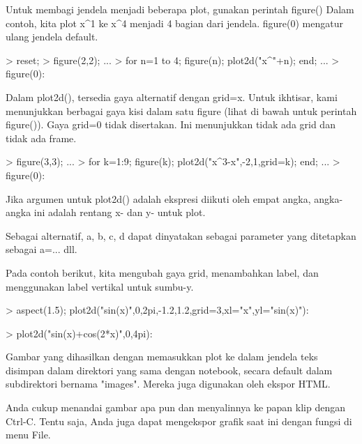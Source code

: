 \documentclass[a4paper,10pt]{article}
\begin{document}
\begin{eulernotebook}
\begin{eulercomment}
\begin{eulercomment}
\begin{eulercomment}
\begin{eulercomment}
\begin{eulercomment}
\begin{eulercomment}
\begin{eulercomment}
Untuk membagi jendela menjadi beberapa plot, gunakan perintah figure()
Dalam contoh, kita plot x\textasciicircum{}1 ke x\textasciicircum{}4 menjadi 4 bagian dari jendela.
figure(0) mengatur ulang jendela default.
\end{eulercomment}
\begin{eulerprompt}
> reset;
> figure(2,2); ...
> for n=1 to 4; figure(n); plot2d("x^"+n); end; ...
> figure(0):
\end{eulerprompt}
\begin{eulercomment}
Dalam plot2d(), tersedia gaya alternatif dengan grid=x. Untuk
ikhtisar, kami menunjukkan berbagai gaya kisi dalam satu figure (lihat
di bawah untuk perintah figure()). Gaya grid=0 tidak disertakan. Ini
menunjukkan tidak ada grid dan tidak ada frame.
\end{eulercomment}
\begin{eulerprompt}
> figure(3,3); ...
> for k=1:9; figure(k); plot2d("x^3-x",-2,1,grid=k); end; ...
> figure(0):
\end{eulerprompt}
\begin{eulercomment}
Jika argumen untuk plot2d() adalah ekspresi diikuti oleh empat angka,
angka-angka ini adalah rentang x- dan y- untuk plot.

Sebagai alternatif, a, b, c, d dapat dinyatakan sebagai parameter yang
ditetapkan sebagai a=... dll.

Pada contoh berikut, kita mengubah gaya grid, menambahkan label, dan
menggunakan label vertikal untuk sumbu-y.
\end{eulercomment}
\begin{eulerprompt}
> aspect(1.5); plot2d("sin(x)",0,2pi,-1.2,1.2,grid=3,xl="x",yl="sin(x)"):
\end{eulerprompt}
\begin{eulerprompt}
> plot2d("sin(x)+cos(2*x)",0,4pi):
\end{eulerprompt}
\begin{eulercomment}
Gambar yang dihasilkan dengan memasukkan plot ke dalam jendela teks
disimpan dalam direktori yang sama dengan notebook, secara default
dalam subdirektori bernama "images". Mereka juga digunakan oleh ekspor
HTML.

Anda cukup menandai gambar apa pun dan menyalinnya ke papan klip
dengan Ctrl-C. Tentu saja, Anda juga dapat mengekspor grafik saat ini
dengan fungsi di menu File.


\end{eulercomment}
\end{eulercomment}
\end{eulercomment}
\end{eulercomment}
\end{eulercomment}
\end{eulercomment}
\end{eulercomment}
\end{eulernotebook}
\end{document}
